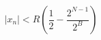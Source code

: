\documentclass[a4paper,conference,onecolumn]{IEEETran}
\newcommand{\eqna}[1]{
\setlength{\arraycolsep}{0.0em}
\begin{eqnarray} 
#1
\end{eqnarray}
\setlength{\arraycolsep}{5pt}
}
\begin{document}
\eqna{
\label{sdreq:inlimit}
  |x_n| < R\left(\dfrac{1}{2}- \dfrac{2^{N-1}}{2^B}\right)\nonumber
}
\end{document}
